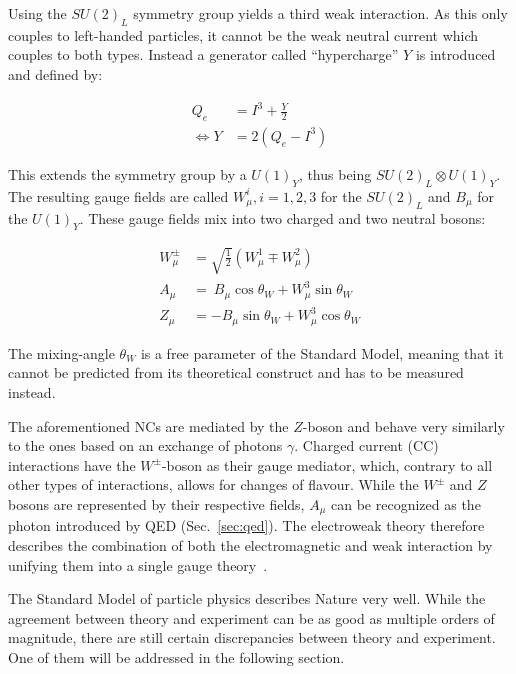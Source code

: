 Using the $SU(2)_L$ symmetry group yields a third weak interaction. As this only couples to left-handed particles, it cannot be the weak neutral current which couples to both types. Instead a generator called ``hypercharge'' $Y$ is introduced and defined by:

\begin{align}
  \label{eq:hypercharge}
                  Q_e &= I^3 + \frac{Y}{2} \\
  \Leftrightarrow Y   &= 2 \left( Q_e - I^3 \right)
\end{align}

\noindent This extends the symmetry group by a $U(1)_Y$, thus being $SU(2)_L \otimes U(1)_Y$. The resulting gauge fields are called $W^i_\mu, i = 1,2,3$ for the $SU(2)_L$ and $B_\mu$ for the $U(1)_Y$. These gauge fields mix into two charged and two neutral bosons:

\begin{align}
  \label{eq:ewbosons}
  W^\pm_\mu & = \sqrt{\frac{1}{2}} \left( W^1_\mu \mp W^2_\mu \right) \\
  A_\mu & = \ B_\mu \cos{\theta_W} + W^3_\mu \sin{\theta_W} \\
  Z_\mu & = - B_\mu \sin{\theta_W} + W^3_\mu \cos{\theta_W}
\end{align}
 
\noindent The mixing-angle $\theta_W$ is a free parameter of the Standard Model, meaning that it cannot be predicted from its theoretical construct and has to be measured instead.

The aforementioned NCs are mediated by the $Z$-boson and behave very similarly to the ones based on an exchange of photons $\gamma$. Charged current (CC) interactions have the $W^\pm$-boson as their gauge mediator, which, contrary to all other types of interactions, allows for changes of flavour. While the $W^\pm$ and $Z$ bosons are represented by their respective fields, $A_\mu$ can be recognized as the photon introduced by QED (Sec.~\ref{sec:qed}). The electroweak theory therefore describes the combination of both the electromagnetic and weak interaction by unifying them into a single gauge theory~\cite{standardmodel-salam,standardmodel-weinberg,standardmodel-glashow}.

The Standard Model of particle physics describes Nature very well. While the agreement between theory and experiment can be as good as multiple orders of magnitude, there are still certain discrepancies between theory and experiment. One of them will be addressed in the following section.

